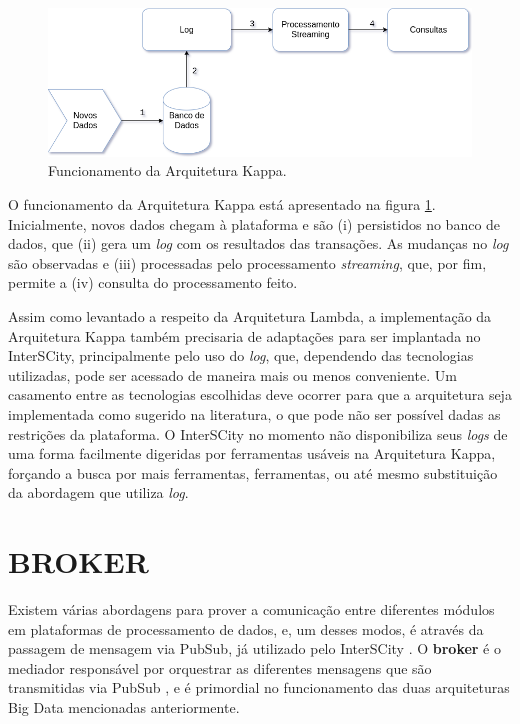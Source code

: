 \newpage

\begin{figure}
  \centering
    \includegraphics[scale=0.5]{figuras/kappa_architecture.png}
  \caption{Funcionamento da Arquitetura Kappa.}
  \label{fig:kappa-lifecycle}
\end{figure}

O funcionamento da Arquitetura Kappa está apresentado na figura
\ref{fig:kappa-lifecycle}. Inicialmente, novos dados chegam à plataforma e são
(i) persistidos no banco de dados, que (ii) gera um \textit{log} com os
resultados das transações. As mudanças no \textit{log} são observadas e
(iii) processadas pelo processamento \textit{streaming}, que, por fim, permite
a (iv) consulta do processamento feito.

Assim como levantado a respeito da Arquitetura Lambda, a implementação da
Arquitetura Kappa também precisaria de adaptações para ser implantada no
InterSCity, principalmente pelo uso do \textit{log}, que, dependendo das
tecnologias utilizadas, pode ser acessado de maneira mais ou menos conveniente.
Um casamento entre as tecnologias escolhidas deve ocorrer para que a
arquitetura seja implementada como sugerido na literatura, o que pode não ser
possível dadas as restrições da plataforma. O InterSCity no momento não
disponibiliza seus \textit{logs} de uma forma facilmente digeridas por
ferramentas usáveis na Arquitetura Kappa, forçando a busca por mais ferramentas,
ferramentas, ou até mesmo substituição da abordagem que utiliza \textit{log}.

\section{BROKER}

Existem várias abordagens para prover a comunicação entre diferentes módulos em
plataformas de processamento de dados, e, um desses modos, é através da passagem
de mensagem via PubSub, já utilizado pelo InterSCity \cite{delesposte2017}.
O \textbf{broker} é o mediador responsável por orquestrar as diferentes
mensagens que são transmitidas via PubSub \cite{marz2015}, e é primordial no
funcionamento das duas arquiteturas Big Data mencionadas anteriormente.

